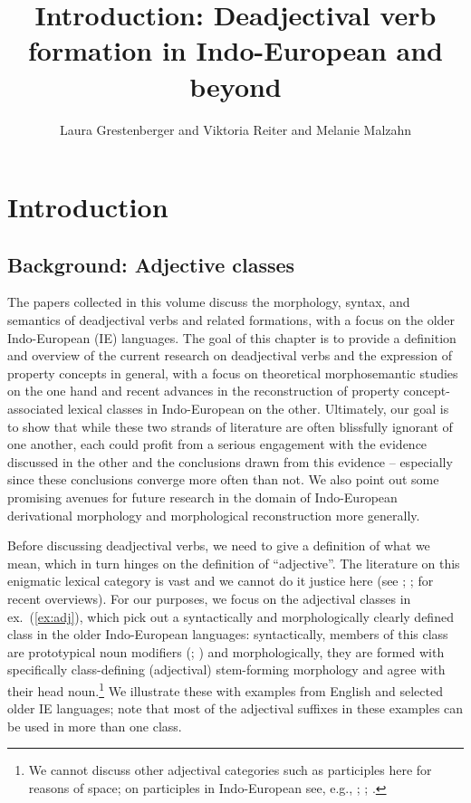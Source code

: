 \documentclass[output=paper,colorlinks,citecolor=brown]{langscibook}
\author{Laura Grestenberger%
\affiliation{University of Vienna} and
        Viktoria Reiter%
        \affiliation{University of Vienna} and
        Melanie Malzahn%
        \affiliation{University of Vienna}}
\title{Introduction: Deadjectival verb formation in Indo-European and beyond}
\begin{document}
\maketitle

\section{Introduction}
\label{sec:intro}

\subsection{Background: Adjective classes}
\label{sec:adjclass}

The papers collected in this volume discuss the morphology, syntax, and semantics of deadjectival verbs and related formations, with a focus on the older Indo-European (IE)  languages. The goal of this chapter is to provide a definition  and overview of the current research on deadjectival verbs and the expression of property concepts in general, with a focus on  theoretical morphosemantic studies on the one hand and recent advances in the reconstruction of property concept-associated lexical classes in Indo-European on the other. Ultimately, our goal is to show that while these two strands of literature are often blissfully ignorant of one another, each could profit from a serious engagement with the evidence discussed in the other and the conclusions drawn from this evidence -- especially since these conclusions converge more often than not. We also point out some promising avenues for future research in the domain of Indo-European derivational morphology and morphological reconstruction more generally. 

Before discussing deadjectival verbs, we need to give a definition of what we mean, which in turn hinges on the definition of ``adjective''. The literature on this enigmatic lexical category is vast and we cannot do it justice here (see \citealt{FabregasMarin2017}; \citealt{PanagiotidisMitrovic}; \citealt{Beck2023}  for recent overviews). For our purposes, we focus on the adjectival classes  in ex.\ (\ref{ex:adj}), which pick out a syntactically and morphologically clearly defined class in the older Indo-European languages: syntactically, members of this class are prototypical noun modifiers (\citealt{Croft1991}; \citealt{Alfieri2014}) and morphologically, they are formed with specifically class-defining (adjectival) stem-forming morphology and agree with their head noun.\footnote{We cannot discuss other adjectival categories such as participles here for reasons of space; on participles in Indo-European see, e.g., \citealt{Lowe2015};  \citealt{FellnerGrestenberger2018}; \citealt{Grestenberger2020}.} We illustrate these with examples from English and selected older IE languages; note that most of the adjectival suffixes in these examples can be used in more than one class. 
\end{document}
